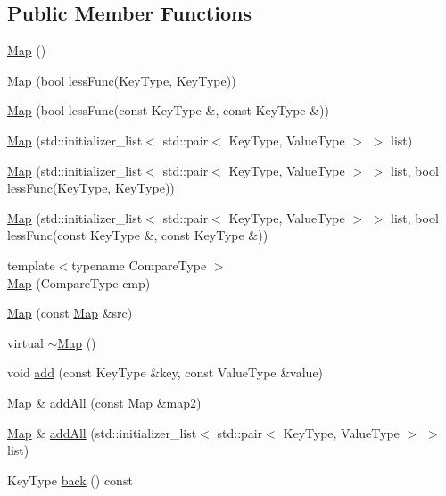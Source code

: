 \subsection*{Public Member Functions}
\begin{DoxyCompactItemize}
\item 
\mbox{\hyperlink{classMap_a49848ab3a0e1934c5615242b67af68c7}{Map}} ()
\item 
\mbox{\hyperlink{classMap_ad1ada5d0cc94f69c235f999c2fbc3dff}{Map}} (bool less\+Func(Key\+Type, Key\+Type))
\item 
\mbox{\hyperlink{classMap_a0f8061a4d1a8b6cc2a005d457f7f99d0}{Map}} (bool less\+Func(const Key\+Type \&, const Key\+Type \&))
\item 
\mbox{\hyperlink{classMap_a3c4b56834747c9afec2e1d843348c7a9}{Map}} (std\+::initializer\+\_\+list$<$ std\+::pair$<$ Key\+Type, Value\+Type $>$ $>$ list)
\item 
\mbox{\hyperlink{classMap_a1015ca1e803c78ab7fd4414bd4d58888}{Map}} (std\+::initializer\+\_\+list$<$ std\+::pair$<$ Key\+Type, Value\+Type $>$ $>$ list, bool less\+Func(Key\+Type, Key\+Type))
\item 
\mbox{\hyperlink{classMap_af04ed5af861a0358b240f8dbd5b3ac77}{Map}} (std\+::initializer\+\_\+list$<$ std\+::pair$<$ Key\+Type, Value\+Type $>$ $>$ list, bool less\+Func(const Key\+Type \&, const Key\+Type \&))
\item 
{\footnotesize template$<$typename Compare\+Type $>$ }\\\mbox{\hyperlink{classMap_a0f654fae6d97cd1f9b6420d00837eeeb}{Map}} (Compare\+Type cmp)
\item 
\mbox{\hyperlink{classMap_a81c36bfbe9ece7606add9fc522cad3b2}{Map}} (const \mbox{\hyperlink{classMap}{Map}} \&src)
\item 
virtual \mbox{\hyperlink{classMap_ac59b12e62f61360298c324334ecc6bc9}{$\sim$\+Map}} ()
\item 
void \mbox{\hyperlink{classMap_a9129d6095063e7e14d85c627d35086a5}{add}} (const Key\+Type \&key, const Value\+Type \&value)
\item 
\mbox{\hyperlink{classMap}{Map}} \& \mbox{\hyperlink{classMap_a44f4dae7b5abf1bd265cd5e8cb6cf47b}{add\+All}} (const \mbox{\hyperlink{classMap}{Map}} \&map2)
\item 
\mbox{\hyperlink{classMap}{Map}} \& \mbox{\hyperlink{classMap_a6a9d926265bac6843977955112057120}{add\+All}} (std\+::initializer\+\_\+list$<$ std\+::pair$<$ Key\+Type, Value\+Type $>$ $>$ list)
\item 
Key\+Type \mbox{\hyperlink{classMap_adfa4b8f8e4f5ecc11fb76a3efba70d70}{back}} () const

\end{DoxyCompactItemize}
